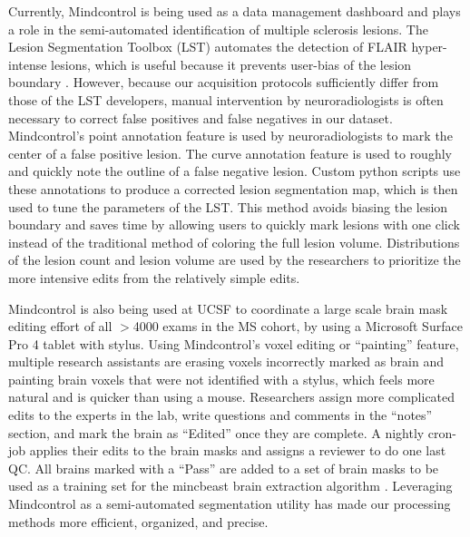 Currently, Mindcontrol is being used as a data management dashboard and plays a role in the semi-automated identification of multiple sclerosis lesions. The Lesion Segmentation Toolbox (LST) automates the detection of FLAIR hyper-intense lesions, which is useful because it prevents user-bias of the lesion boundary \cite{Schmidt_2012}. However, because our acquisition protocols sufficiently differ from those of the LST developers, manual intervention by neuroradiologists is often necessary to correct false positives and false negatives in our dataset. Mindcontrol's point annotation feature is used by neuroradiologists to mark the center of a false positive lesion. The curve annotation feature is used to roughly and quickly note the outline of a false negative lesion. Custom python scripts use these annotations to produce a corrected lesion segmentation map, which is then used to tune the parameters of the LST. This method avoids biasing the lesion boundary and saves time by allowing users to quickly mark lesions with one click instead of the traditional method of coloring the full lesion volume. Distributions of the lesion count and lesion volume are used by the researchers to prioritize the more intensive edits from the relatively simple edits.

Mindcontrol is also being used at UCSF to coordinate a large scale brain mask editing effort of all $>$4000 exams in the MS cohort, by using a Microsoft Surface Pro 4 tablet with stylus. Using Mindcontrol's voxel editing or ``painting'' feature, multiple research assistants are erasing voxels incorrectly marked as brain and painting brain voxels that were not identified with a stylus, which feels more natural and is quicker than using a mouse. Researchers assign more complicated edits to the experts in the lab, write questions and comments in the ``notes'' section, and mark the brain as ``Edited'' once they are complete. A nightly cron-job applies their edits to the brain masks and assigns a reviewer to do one last QC. All brains marked with a ``Pass'' are added to a set of brain masks to be  used as a training set for the mincbeast brain extraction algorithm \cite{eskildsen2012beast}. Leveraging Mindcontrol as a semi-automated segmentation utility has made our processing methods more efficient, organized, and precise.





